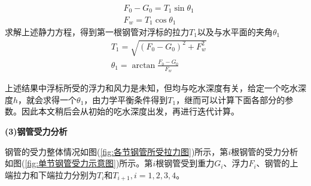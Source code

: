             \begin{align*}
            & F_0 - G_0 = T_1\sin \theta_1\\
            & F_w = T_1\cos \theta_1
            \end{align*}
            求解上述静力方程，得到第一根钢管对浮标的拉力$T_1$以及与水平面的夹角$\theta_1$
            \begin{align*}
            & T_1 = \sqrt{(F_0-G_0)^2+ F_w^2}\\
            & \theta_1 = \arctan \frac{F_0-G_0}{F_w}
            \end{align*}
            \par
            上述结果中浮标所受的浮力和风力是未知，但均与吃水深度有关，给定一个吃水深度$h$，就会求得一个$\theta_1$，由力学平衡条件得到$T_1$，继而可以计算下面各部分的参数。因此本文稍后会从初始的吃水深度出发，再进行迭代计算。
            \par
            \textbf{(3)钢管受力分析}
            \par
            钢管的受力整体情况如图(\ref{fig:各节钢管所受拉力图})所示，第$i$根钢管的受力分析如图(\ref{fig:单节钢管受力示意图})所示。第$i$根钢管受到重力$G_i$、浮力$F_i$、钢管的上端拉力和下端拉力分别为$T_i$和$T_{i+1},i = 1,2,3,4$。
